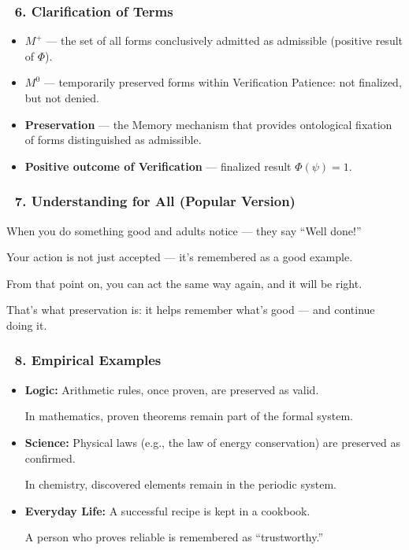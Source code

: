 \documentclass[12pt]{article}
\begin{document}
\subsubsection*{🔹 6. Clarification of Terms}

\begin{itemize}
\item $M^+$ — the set of all forms conclusively admitted as admissible (positive result of $\Phi$).
\item $M^0$ — temporarily preserved forms within Verification Patience: not finalized, but not denied.
\item \textbf{Preservation} — the Memory mechanism that provides ontological fixation of forms distinguished as admissible.
\item \textbf{Positive outcome of Verification} — finalized result $\Phi(\psi) = 1$.
\end{itemize}

\subsubsection*{🔹 7. Understanding for All (Popular Version)}

When you do something good and adults notice — they say ``Well done!''

Your action is not just accepted — it's remembered as a good example.

From that point on, you can act the same way again, and it will be right.

That’s what preservation is: it helps remember what’s good — and continue doing it.

\subsubsection*{🔹 8. Empirical Examples}

\begin{itemize}
\item \textbf{Logic:}
Arithmetic rules, once proven, are preserved as valid.

In mathematics, proven theorems remain part of the formal system.

\item \textbf{Science:}
Physical laws (e.g., the law of energy conservation) are preserved as confirmed.

In chemistry, discovered elements remain in the periodic system.

\item \textbf{Everyday Life:}
A successful recipe is kept in a cookbook.

A person who proves reliable is remembered as ``trustworthy.''
\end{itemize}
\end{document}
